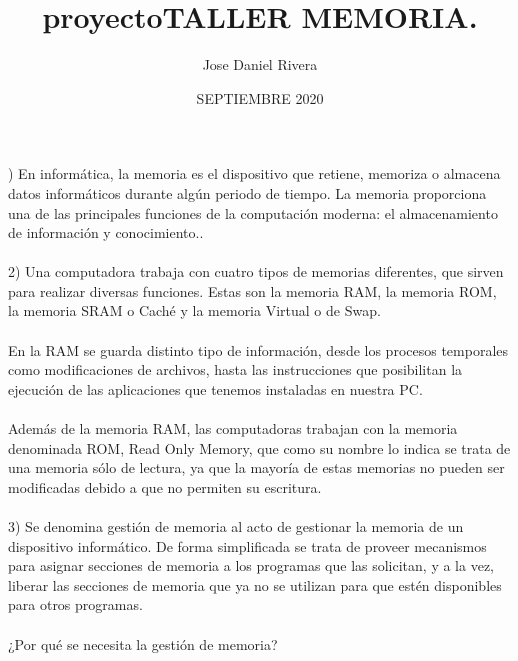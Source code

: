 \documentclass[12pt]{article}
\title{proyecto}
\author{Jose Daniel Rivera }
\date{SEPTIEMBRE 2020}
\begin{document}
\title{TALLER MEMORIA. \\}

\maketitle

)	En informática, la memoria es el dispositivo que retiene, memoriza o almacena datos informáticos durante algún periodo de tiempo. La memoria proporciona una de las principales funciones de la computación moderna: el almacenamiento de información y conocimiento..\\
\noindent
\\
2)	Una computadora trabaja con cuatro tipos de memorias diferentes, que sirven para realizar diversas funciones. Estas son la memoria RAM, la memoria ROM, la memoria SRAM o Caché y la memoria Virtual o de Swap.\\
\noindent
\\
En la RAM se guarda distinto tipo de información, desde los procesos temporales como modificaciones de archivos, hasta las instrucciones que posibilitan la ejecución de las aplicaciones que tenemos instaladas en nuestra PC.\cite{senovilla2005}\\
\noindent
\\
Además de la memoria RAM, las computadoras trabajan con la memoria denominada ROM, Read Only Memory, que como su nombre lo indica se trata de una memoria sólo de lectura, ya que la mayoría de estas memorias no pueden ser modificadas debido a que no permiten su escritura.\\
\noindent
\\ 
3)	Se denomina gestión de memoria al acto de gestionar la memoria de un dispositivo informático. De forma simplificada se trata de proveer mecanismos para asignar secciones de memoria a los programas que las solicitan, y a la vez, liberar las secciones de memoria que ya no se utilizan para que estén disponibles para otros programas.\\
\noindent
\\
¿Por qué se necesita la gestión de memoria?
\end{document}
